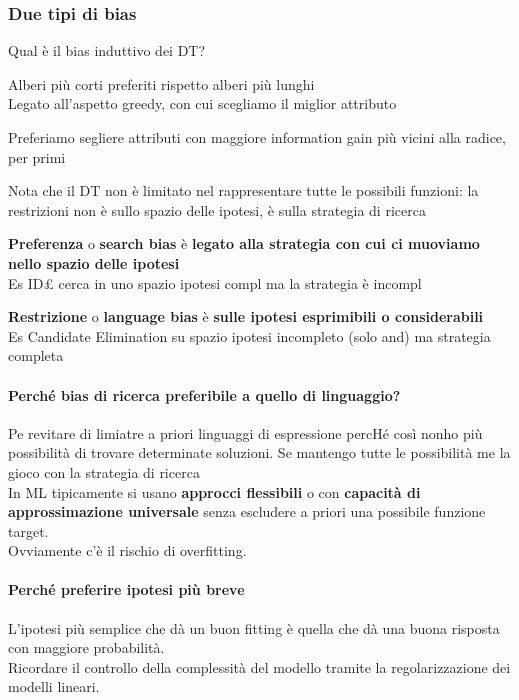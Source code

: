 \documentclass[10pt]{book}
\begin{document}
\subsubsection{Due tipi di bias}
Qual è il bias induttivo dei DT?
\begin{list}{}{}
	\item Alberi più corti preferiti rispetto alberi più lunghi\\
	Legato all'aspetto greedy, con cui scegliamo il miglior attributo
	\item Preferiamo segliere attributi con maggiore information gain più vicini alla radice, per primi
\end{list}
Nota che il DT non è limitato nel rappresentare tutte le possibili funzioni: la restrizioni non è sullo spazio delle ipotesi, è sulla strategia di ricerca
\begin{list}{}{}
	\item \textbf{Preferenza} o \textbf{search bias} è \textbf{legato alla strategia con cui ci muoviamo nello spazio delle ipotesi}\\
	Es ID£ cerca in uno spazio ipotesi compl ma la strategia è incompl
	\item \textbf{Restrizione} o \textbf{language bias} è \textbf{sulle ipotesi esprimibili o considerabili}\\
	Es Candidate Elimination su spazio ipotesi incompleto (solo and) ma strategia completa
\end{list}
\paragraph{Perché bias di ricerca preferibile a quello di linguaggio?} Pe revitare di limiatre a priori linguaggi di espressione percHé così nonho più possibilità di trovare determinate soluzioni. Se mantengo tutte le possibilità me la gioco con la strategia di ricerca\\
In ML tipicamente si usano \textbf{approcci flessibili} o con \textbf{capacità di approssimazione universale} senza escludere a priori una possibile funzione target.\\Ovviamente c'è il rischio di overfitting.
\paragraph{Perché preferire ipotesi più breve} L'ipotesi più semplice che dà un buon fitting è quella che dà una buona risposta con maggiore probabilità.\\
Ricordare il controllo della complessità del modello tramite la regolarizzazione dei modelli lineari.
\end{document}
